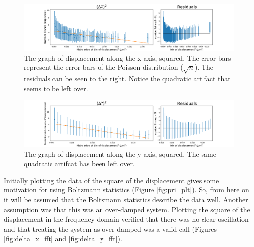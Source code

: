 \documentclass[12pt]{article}
\begin{document}
\begin{figure}
\centering
    \includegraphics[width=\textwidth]{delta_x.pdf}
	\caption{The graph of displacement along the x-axis, squared. The error bars represent the error bars of the Poisson distribution ($\sqrt{n}$). The residuals can be seen to the right. Notice the quadratic artifact that seems to be left over.}
    \label{fig:delta_x}
\end{figure} %

\begin{figure}
\centering
    \includegraphics[width=\textwidth]{delta_y.pdf}
	\caption{The graph of displacement along the y-axis, squared. The same quadratic artifcat has been left over.}
    \label{fig:delta_y}
\end{figure} %



Initially plotting the data of the square of the displacement gives some motivation for using Boltzmann statistics (Figure \ref{fig:pri_plt}). So, from here on it will be assumed that the Boltzmann statistics describe the data well. Another assumption was that this was an over-damped system. Plotting the square of the displacement in the frequency domain verified that there was no clear oscillation and that treating the system as over-damped was a valid call (Figures \ref{fig:delta_x_fft} and \ref{fig:delta_y_fft}). 
\end{document}
